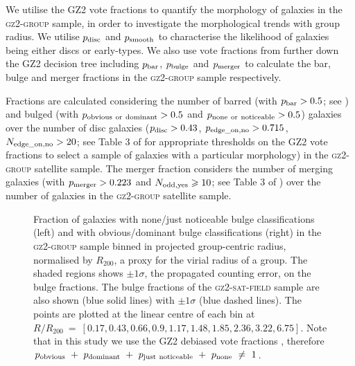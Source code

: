 \documentclass[useAMS,usenatbib]{mn2e}
\begin{document}
We utilise the GZ2 vote fractions to quantify the morphology of galaxies in the \textsc{gz2-group} sample, in order to investigate the morphological trends with group radius. We utilise $p_{\rm{disc}}$ and $p_{\rm{smooth}}$ to characterise the likelihood of galaxies being either discs or early-types. We also use vote fractions from further down the GZ2 decision tree including $p_{\rm{bar}}$, $p_{\rm{bulge}}$ and $p_{\rm{merger}}$ to calculate the bar, bulge and merger fractions in the \textsc{gz2-group} sample respectively. 

Fractions are calculated considering the number of barred (with $p_{\rm{bar}} > 0.5$; see \citealt{masters11a, Cheung13}) and bulged (with $p_{\rm{obvious}~\rm{or}~\rm{dominant}} > 0.5$ and $p_{\rm{none}~\rm{or}~\rm{noticeable}} > 0.5$) galaxies over the number of disc galaxies ($p_{\rm{disc}} > 0.43$, $p_{\rm{edge\_on, no}} > 0.715$, $N_{\rm{edge\_on, no}} > 20$; see Table 3 of \citealt{GZ2} for appropriate thresholds on the GZ2 vote fractions to select a sample of galaxies with a particular morphology) in the \textsc{gz2-group} satellite sample. The merger fraction considers the number of merging galaxies (with $p_{\rm{merger}} > 0.223$ and $N_{\rm{odd, yes}}\geq10$; see Table 3 of \citealt{GZ2}) over the number of galaxies in the \textsc{gz2-group} satellite sample. 

\begin{figure}
\caption[Bulge fraction with group radius in the \textsc{gz2-group} sample]{Fraction of galaxies with none/just noticeable bulge classifications (left) and with obvious/dominant bulge classifications (right) in the \textsc{gz2-group} sample binned in projected group-centric radius, normalised by $R_{200}$, a proxy for the virial radius of a group. The shaded regions shows $\pm1\sigma$, the propagated counting error, on the bulge fractions. The bulge fractions of the \textsc{gz2-sat-field} sample are also shown (blue solid lines) with $\pm1\sigma$ (blue dashed lines). The points are plotted at the linear centre of each bin at $R/R_{200}~=~ [0.17,  0.43,  0.66,  0.9 ,  1.17,  1.48,  1.85,  2.36,  3.22,  6.75]$. Note that in this study we use the GZ2 debiased vote fractions \citep[adjusted for classification bias, see][]{GZ2}, therefore $p_{\rm{obvious}}~+~p_{\rm{dominant}}~+~p_{\rm{just}~\rm{noticeable}}~+~p_{\rm{none}}~\neq~1$.}
\label{fig:bulgeradius}
\end{figure}
\end{document}
